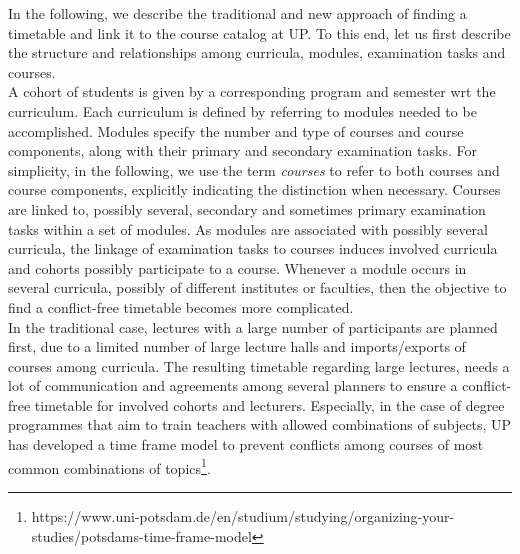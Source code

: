 \documentclass{easychair}
\newcommand{\UP}{UP}
\begin{document}
  In the following, we describe the traditional and new approach of finding a timetable and link it to the course catalog at \UP{}. 
  To this end, let us first describe the structure and relationships among curricula, modules, examination tasks and courses. \\
  A cohort of students is given by a corresponding program and semester wrt the curriculum. 
  Each curriculum is defined by referring to modules needed to be accomplished. 
  Modules specify the number and type of courses and course components, along with their primary and secondary examination tasks. 
  For simplicity, in the following, we use the term \textit{courses} to refer to both courses and course components, explicitly indicating the distinction when necessary. 
  Courses are linked to, possibly several, secondary and sometimes primary examination tasks within a set of modules. 
  As modules are associated with possibly several curricula, the linkage of examination tasks to courses induces involved curricula and cohorts possibly participate to a course. 
  Whenever a module occurs in several curricula, possibly of different institutes or faculties, then the objective to find a conflict-free timetable becomes more complicated. \\
  In the traditional case, lectures with a large number of participants are planned first, due to a limited number of large lecture halls and imports/exports of courses among curricula. 
  The resulting timetable regarding large lectures, needs a lot of communication and agreements among several planners to ensure a conflict-free timetable for involved cohorts and lecturers. 
  Especially, in the case of degree programmes that aim to train teachers with allowed combinations of subjects, \UP{} has developed a time frame model to prevent conflicts among courses of most common combinations of topics\footnote{https://www.uni-potsdam.de/en/studium/studying/organizing-your-studies/potsdams-time-frame-model}.
\end{document}
